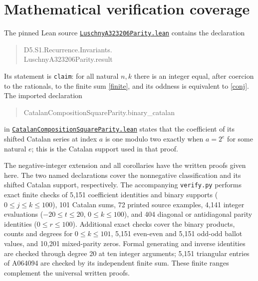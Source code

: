 \documentclass[11pt]{article}
\begin{document}
\section{Mathematical verification coverage}
The pinned Lean source
\href{https://github.com/the-omega-institute/trureturing/blob/b0f7c01b01511ea00428c1b6edad5dd2b372eaf8/D5/S1/Recurrence/Invariants/LuschnyA323206Parity.lean}
{\texttt{LuschnyA323206Parity.lean}}
contains the declaration
\begin{quote}\small\ttfamily
D5.S1.Recurrence.Invariants.\\
LuschnyA323206Parity.result
\end{quote}
Its statement is \texttt{claim}: for all natural $n,k$ there is an integer
equal, after coercion to the rationals, to the finite sum \eqref{finite},
and its oddness is equivalent to \eqref{conj}.
The imported declaration
\begin{quote}\small\ttfamily
CatalanCompositionSquareParity.binary\_catalan
\end{quote}
in
\href{https://github.com/the-omega-institute/trureturing/blob/b0f7c01b01511ea00428c1b6edad5dd2b372eaf8/D5/S1/Recurrence/Invariants/CatalanCompositionSquareParity.lean}
{\texttt{CatalanCompositionSquareParity.lean}}
states that the coefficient of its shifted Catalan series at index $a$
is one modulo two exactly when $a=2^e$ for some natural $e$; this is the
Catalan support used in that proof.

The negative-integer extension and all corollaries have the written
proofs given here. The two named declarations cover the nonnegative
classification and its shifted Catalan support, respectively.
The accompanying \texttt{verify.py} performs exact finite checks of
5,151 coefficient identities and binary supports ($0\le j\le k\le100$),
101 Catalan sums, 72 printed source examples, 4,141 integer evaluations
($-20\le t\le20$, $0\le k\le100$), and 404 diagonal or antidiagonal
parity identities ($0\le r\le100$). Additional exact checks cover the
binary products, counts and degrees for $0\le k\le101$,
5,151 even-even and 5,151 odd-odd ballot values, and 10,201 mixed-parity
zeros. Formal generating and inverse identities are checked through
degree 20 at ten integer arguments; 5,151 triangular entries of A064094
are checked by its independent finite sum. These finite ranges complement the
universal written proofs.
\end{document}
